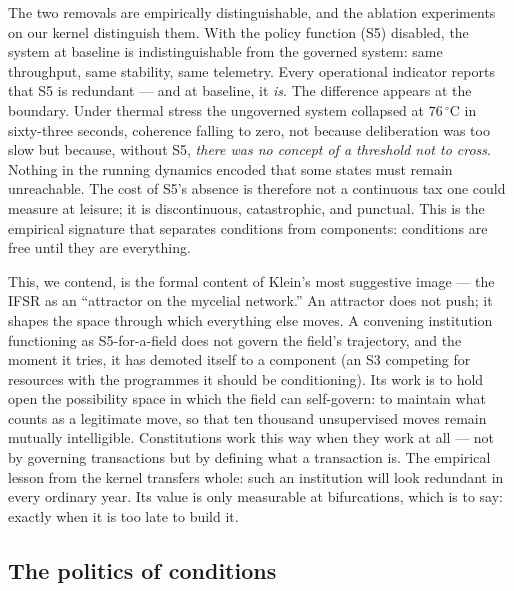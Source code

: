 \documentclass[12pt]{article}
\begin{document}
The two removals are empirically distinguishable, and the ablation experiments
on our kernel distinguish them. With the policy function (S5) disabled, the
system at baseline is indistinguishable from the governed system: same
throughput, same stability, same telemetry. Every operational indicator
reports that S5 is redundant --- and at baseline, it \emph{is}. The difference
appears at the boundary. Under thermal stress the ungoverned system collapsed
at $76\,^{\circ}$C in sixty-three seconds, coherence falling to zero, not
because deliberation was too slow but because, without S5, \emph{there was no
concept of a threshold not to cross}. Nothing in the running dynamics encoded
that some states must remain unreachable. The cost of S5's absence is
therefore not a continuous tax one could measure at leisure; it is
discontinuous, catastrophic, and punctual. This is the empirical signature
that separates conditions from components: conditions are free until they are
everything.

This, we contend, is the formal content of Klein's most suggestive image ---
the IFSR as an ``attractor on the mycelial network.'' An attractor does not
push; it shapes the space through which everything else moves. A convening
institution functioning as S5-for-a-field does not govern the field's
trajectory, and the moment it tries, it has demoted itself to a component
(an S3 competing for resources with the programmes it should be conditioning).
Its work is to hold open the possibility space in which the field can
self-govern: to maintain what counts as a legitimate move, so that ten
thousand unsupervised moves remain mutually intelligible. Constitutions work
this way when they work at all --- not by governing transactions but by
defining what a transaction is. The empirical lesson from the kernel transfers
whole: such an institution will look redundant in every ordinary year. Its
value is only measurable at bifurcations, which is to say: exactly when it is
too late to build it.

\subsection*{The politics of conditions}
\end{document}
